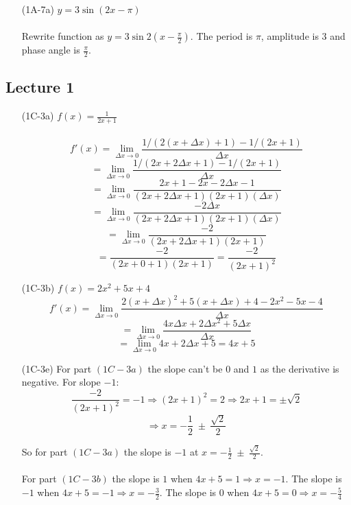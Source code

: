 \documentclass{article}
\begin{document}
\begin{itemize}
\item[(1A-7a)] $y = 3\sin (2x - \pi)$ \\ \\
Rewrite function as $y = 3 \sin 2(x-\frac{\pi}{2})$. The period is $\pi$, amplitude is $3$ and phase angle is $\frac{\pi}{2}$.

\begin{figure}[htp!]
    \centering
    
    \label{fig:fig4}
\end{figure}

\end{itemize}

\subsection{Lecture 1}
\begin{itemize}
\item[(1C-3a)] $f(x) = \frac{1}{2x+1}$ \\ \\
\[ f'(x) = \lim_{\Delta x \to 0} \frac{1/(2(x+ \Delta x)+1) - 1/(2x+1)}{\Delta x}\]
\[ = \lim_{\Delta x \to 0} \frac{1/(2x+ 2\Delta x+1) - 1/(2x+1)}{\Delta x}\]
\[ = \lim_{\Delta x \to 0} \frac{2x + 1 - 2x - 2 \Delta x - 1}{(2x+ 2\Delta x+1)(2x+1)(\Delta x)}\]
\[ = \lim_{\Delta x \to 0} \frac{-2 \Delta x}{(2x+ 2\Delta x+1)(2x+1)(\Delta x)}\]
\[ = \lim_{\Delta x \to 0} \frac{-2}{(2x+ 2\Delta x+1)(2x+1)}\]
\[ = \frac{-2}{(2x+ 0 +1)(2x+1)} = \frac{-2}{(2x+1)^2}\]

\item[(1C-3b)] $f(x) = 2x^2 + 5x + 4$
\[ f'(x) = \lim_{\Delta x \to 0} \frac{2(x+\Delta x)^2 + 5(x+\Delta x) + 4 - 2x^2 - 5x - 4}{\Delta x}\]
\[ = \lim_{\Delta x \to 0} \frac{4x\Delta x + 2\Delta x^2 + 5\Delta x}{\Delta x}\]
\[ = \lim_{\Delta x \to 0} 4x + 2\Delta x + 5 = 4x + 5\]
\item[(1C-3e)] For part $(1C-3a)$ the slope can't be $0$ and $1$ as the derivative is negative. For slope $-1$:
\[ \frac{-2}{(2x+1)^2} = -1 \Rightarrow (2x+1)^2 = 2 \Rightarrow 2x+1 = \pm\sqrt{2}\]
\[ \Rightarrow x = -\frac{1}{2} \; \pm\ \frac{\sqrt{2}}
{2}\]

So for part $(1C-3a)$ the slope is $-1$ at $x = -\frac{1}{2} \; \pm\ \frac{\sqrt{2}}{2}$. \\ \\
For part $(1C-3b)$ the slope is $1$ when $4x + 5 = 1 \Rightarrow x = -1$. The slope is $-1$ when $4x + 5 = -1 \Rightarrow x = -\frac{3}{2}$. The slope is $0$ when $4x + 5 = 0 \Rightarrow x = -\frac{5}{4}$


\end{itemize}
\end{document}

